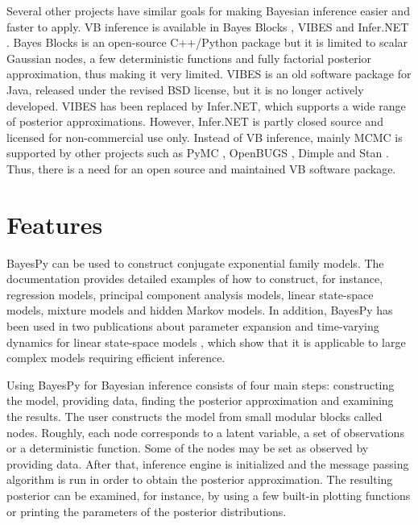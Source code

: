 \documentclass[twoside,11pt]{article}
\begin{document}
Several other projects have similar goals for making Bayesian inference easier
and faster to apply.  VB inference is available in Bayes Blocks
\citep{Raiko:2007}, VIBES \citep{Bishop:2002} and Infer.NET \citep{Infer.NET}.
Bayes Blocks is an open-source C++/Python package but it is limited to scalar
Gaussian nodes, a few deterministic functions and fully factorial posterior
approximation, thus making it very limited.  VIBES is an old software package
for Java, released under the revised BSD license, but it is no longer actively
developed.  VIBES has been replaced by Infer.NET, which supports a wide range of
posterior approximations.  However, Infer.NET is partly closed source and
licensed for non-commercial use only.  Instead of VB inference, mainly MCMC is
supported by other projects such as PyMC \citep{PyMC}, OpenBUGS \citep{OpenBUGS},
Dimple \citep{Dimple} and Stan \citep{Stan}.  Thus, there is a need for an open
source and maintained VB software package.



\section{Features}


BayesPy can be used to construct conjugate exponential family models.  The
documentation provides detailed examples of how to construct, for instance,
regression models, principal component analysis models, linear state-space
models, mixture models and hidden Markov models.  In addition, BayesPy has been
used in two publications about parameter expansion and time-varying dynamics for
linear state-space models \citep{Luttinen:2013,Luttinen:2014}, which show that
it is applicable to large complex models requiring efficient inference.



Using BayesPy for Bayesian inference consists of four main steps: constructing
the model, providing data, finding the posterior approximation and examining the
results.  The user constructs the model from small modular blocks called nodes.
Roughly, each node corresponds to a latent variable, a set of observations or a
deterministic function.  Some of the nodes may be set as observed by providing
data.  After that, inference engine is initialized and the message passing
algorithm is run in order to obtain the posterior approximation.  The resulting
posterior can be examined, for instance, by using a few built-in plotting
functions or printing the parameters of the posterior distributions.
\end{document}

